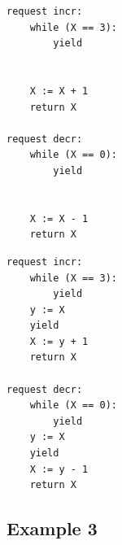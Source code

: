 \noindent
\begin{minipage}[t]{0.45\textwidth}
	\begin{lstlisting}[caption={Serializable},
		label={lst:FredSer},numbers=none]
request incr: 
    while (X == 3):
        yield


    X := X + 1
    return X		

request decr: 
    while (X == 0): 
        yield


    X := X - 1
    return X
		\end{lstlisting}
\end{minipage}
\hfill
\begin{minipage}[t]{0.45\textwidth}
	\begin{lstlisting}[caption={Not serializable},
		label={lst:FredNonSer},numbers=none]
request incr:
    while (X == 3):
        yield
    y := X
    yield
    X := y + 1
    return X		

request decr: 
    while (X == 0):
        yield
    y := X
    yield
    X := y - 1
    return X
		\end{lstlisting}
\end{minipage}
	
\subsection{Example 3}

